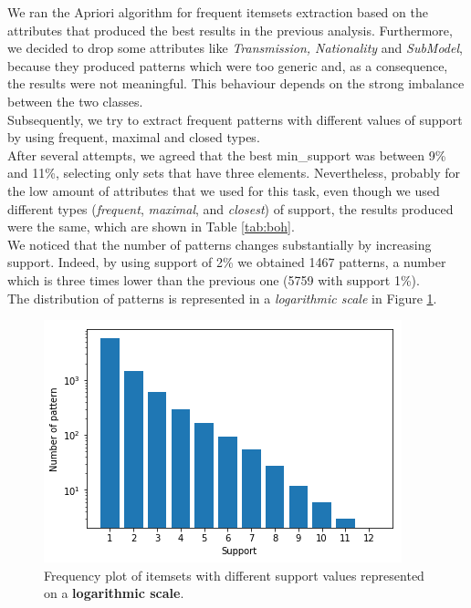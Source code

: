 \documentclass{article}
\begin{document}
	We ran the Apriori algorithm for frequent itemsets extraction based on the attributes that produced the best results in the previous analysis. Furthermore, we decided to drop some attributes like \emph{Transmission, Nationality} and \emph{SubModel}, because they produced patterns which were too generic and, as a consequence, the results were not meaningful. This behaviour depends on the strong imbalance between the two classes.\\
	Subsequently, we try to extract frequent patterns with different values of support by using frequent, maximal and closed types.\\
	After several attempts, we agreed that the best min\_support was between 9\% and 11\%, selecting only sets that have three elements. Nevertheless, probably for the low amount of attributes that we used for this task, even though we used different types (\emph{frequent}, \emph{maximal}, and \emph{closest}) of support, the results produced were the same, which are shown in Table \ref{tab:boh}.\\
	We noticed that the number of patterns changes substantially by increasing support. Indeed, by using support of 2\%  we obtained 1467 patterns, a number which is three times lower than the previous one (5759 with support 1\%).\\
	The distribution of patterns is represented in a \emph{logarithmic scale} in Figure \ref{fig:hyper_rf_us}.
	
	
	\begin{figure}[H]
		\centering
		\includegraphics[width=.4\textwidth]{support.png}
		\caption{Frequency plot of itemsets with different support values represented on a \textbf{logarithmic scale}.}
		\label{fig:hyper_rf_us}
	\end{figure}
	
	
	
\end{document}
